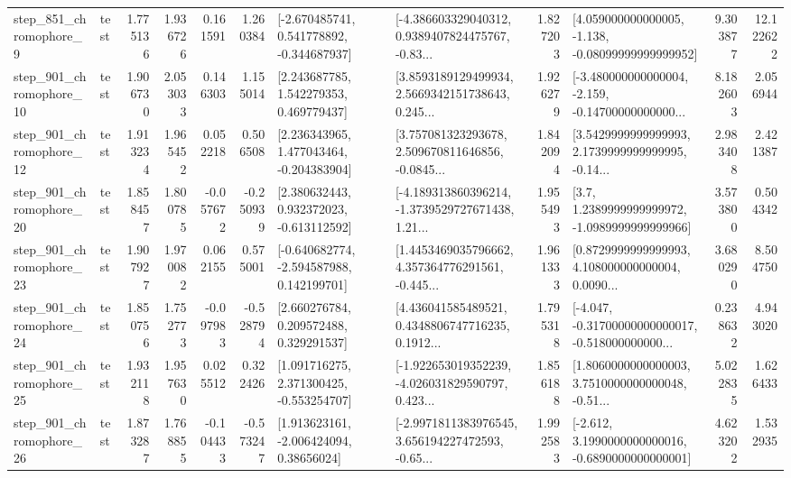 \begin{tabular}{llrrrrllrlrr}
   step\_851\_chromophore\_9 &      test &      1.775136 &    1.936726 &      0.161591 &  1.260384 &   [-2.670485741, 0.541778892, -0.344687937] &  [-4.386603329040312, 0.9389407824475767, -0.83... &       1.827203 &  [4.059000000000005, -1.138, -0.08099999999999952] &            9.303877 &         12.122622 \\
  step\_901\_chromophore\_10 &      test &      1.906730 &    2.053033 &      0.146303 &  1.155014 &     [2.243687785, 1.542279353, 0.469779437] &  [3.8593189129499934, 2.5669342151738643, 0.245... &       1.926279 &  [-3.480000000000004, -2.159, -0.14700000000000... &            8.182603 &          2.056944 \\
  step\_901\_chromophore\_12 &      test &      1.913234 &    1.965452 &      0.052218 &  0.506508 &    [2.236343965, 1.477043464, -0.204383904] &  [3.757081323293678, 2.509670811646856, -0.0845... &       1.842094 &  [3.5429999999999993, 2.1739999999999995, -0.14... &            2.983408 &          2.421387 \\
  step\_901\_chromophore\_20 &      test &      1.858457 &    1.800785 &     -0.057672 & -0.250939 &    [2.380632443, 0.932372023, -0.613112592] &  [-4.189313860396214, -1.3739529727671438, 1.21... &       1.955493 &     [3.7, 1.2389999999999972, -1.0989999999999966] &            3.573800 &          0.504342 \\
  step\_901\_chromophore\_23 &      test &      1.907927 &    1.970082 &      0.062155 &  0.575001 &   [-0.640682774, -2.594587988, 0.142199701] &  [1.4453469035796662, 4.357364776291561, -0.445... &       1.961333 &  [0.8729999999999993, 4.108000000000004, 0.0090... &            3.680290 &          8.504750 \\
  step\_901\_chromophore\_24 &      test &      1.850756 &    1.752773 &     -0.097983 & -0.528794 &     [2.660276784, 0.209572488, 0.329291537] &  [4.436041585489521, 0.4348806747716235, 0.1912... &       1.795318 &  [-4.047, -0.31700000000000017, -0.518000000000... &            0.238632 &          4.943020 \\
  step\_901\_chromophore\_25 &      test &      1.932118 &    1.957630 &      0.025512 &  0.322426 &    [1.091716275, 2.371300425, -0.553254707] &  [-1.922653019352239, -4.026031829590797, 0.423... &       1.856188 &  [1.8060000000000003, 3.7510000000000048, -0.51... &            5.022835 &          1.626433 \\
  step\_901\_chromophore\_26 &      test &      1.873287 &    1.768855 &     -0.104433 & -0.573247 &     [1.913623161, -2.006424094, 0.38656024] &  [-2.9971811383976545, 3.656194227472593, -0.65... &       1.992583 &  [-2.612, 3.1990000000000016, -0.6890000000000001] &            4.623202 &          1.532935 \\

\end{tabular}
